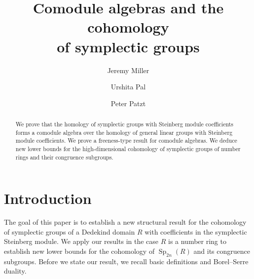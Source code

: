 \documentclass[11pt,letterpaper]{amsart}
\title[Comodule algebras and the cohomology of symplectic groups]{Comodule algebras and  the  cohomology\\ of symplectic groups}
\author{Jeremy Miller}\thanks{Jeremy Miller was supported by NSF Grant DMS2504473 and a Simons Foundation Travel Support for Mathematicians Grant}
\author{Urshita Pal}
\author{Peter Patzt}
\DeclareMathOperator{\Sp}{Sp}
\numberwithin{theoremcounter}{section}
\theoremstyle{definition}
\theoremstyle{remark}
\begin{document}
	
\begin{abstract} 
We prove that the homology of symplectic groups with Steinberg module coefficients forms a comodule algebra over the homology of general linear groups with Steinberg module coefficients. We prove a freeness-type result for comodule algebras. We deduce new lower bounds for the high-dimensional cohomology of symplectic groups of number rings and their congruence subgroups. 
\end{abstract}

\maketitle

\vspace{-.3in}

\tableofcontents

\section{Introduction}

The goal of this paper is to establish a new structural result for the cohomology of symplectic groups of a Dedekind domain $R$ with coefficients in the symplectic Steinberg module. We apply our results in the case $R$ is a number ring to establish new lower bounds for the cohomology of $\Sp_{2n}(R)$ and its congruence subgroups. Before we state our result, we recall basic definitions and Borel--Serre duality. 
\end{document}
